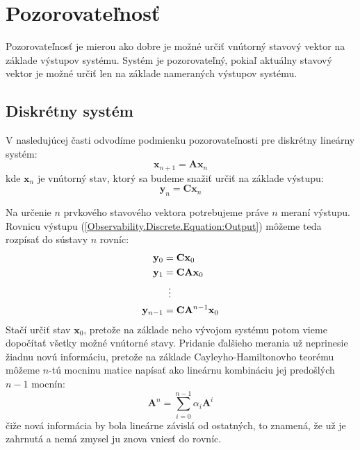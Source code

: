 \documentclass[a4paper, 10pt, ]{article}
\begin{document}
\bigskip

\normalsize
\normalfont



\section{Pozorovateľnosť}

Pozorovateľnosť je mierou ako dobre je možné určiť vnútorný stavový vektor na základe výstupov systému. Systém je pozorovateľný, pokiaľ aktuálny stavový vektor je možné určiť len na základe nameraných výstupov systému. 


\subsection{Diskrétny systém}

V nasledujúcej časti odvodíme podmienku pozorovateľnosti pre diskrétny lineárny systém:
\begin{equation}
    \label{Observability.Discrete.Equation:StateSpaceModel}
    \bm{x}_{n + 1} = \bm{A} \bm{x}_{n}
\end{equation}
kde $\bm{x}_{n}$ je vnútorný stav, ktorý sa budeme snažiť určiť na základe výstupu:
\begin{equation}
    \label{Observability.Discrete.Equation:Output}
    \bm{y}_n = \bm{C} \bm{x}_{n}
\end{equation}

Na určenie $n$ prvkového stavového vektora potrebujeme práve $n$ meraní výstupu. Rovnicu výstupu (\ref{Observability.Discrete.Equation:Output}) môžeme teda rozpísať do sústavy $n$ rovníc:
\begin{subequations}
    \label{Observability.Discrete.Equation:OutputSystem}
    \begin{align}
        \bm{y}_0       &= \bm{C} \bm{x}_{0}                \\
        \bm{y}_1       &= \bm{C} \bm{A} \bm{x}_{0}         \\
        &\vdotswithin{=}                                   \\
        \bm{y}_{n - 1} &= \bm{C} \bm{A}^{n - 1} \bm{x}_{0}
    \end{align}
\end{subequations}
Stačí určiť stav $\bm{x}_0$, pretože na základe neho vývojom systému potom vieme dopočítať všetky možné vnútorné stavy. Pridanie ďalšieho merania už neprinesie žiadnu novú informáciu, pretože na základe Cayleyho-Hamiltonovho teorému môžeme $n$-tú mocninu matice napísať ako lineárnu kombináciu jej predošlých $n - 1$ mocnín:
\begin{equation}
    \bm{A}^n = \sum_{i = 0}^{n - 1} \alpha_{i} \bm{A}^{i}
\end{equation}
čiže nová informácia by bola lineárne závislá od ostatných, to znamená, že už je zahrnutá a nemá zmysel ju znova vniesť do rovníc.
\end{document}
